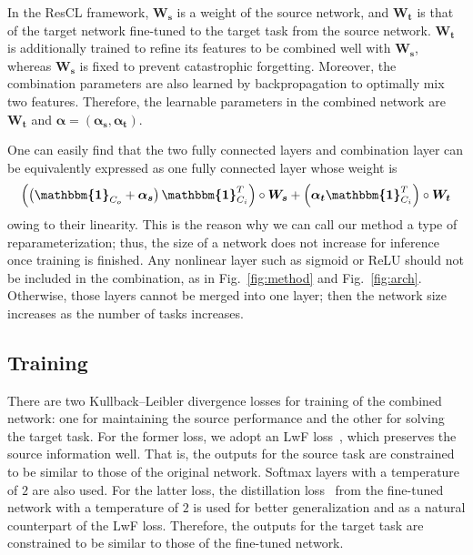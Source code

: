 \documentclass[letterpaper]{article}
\begin{document}
In the ResCL framework, $\bm{W_s}$ is a weight of the source network, and $\bm{W_t}$ is that of the target network fine-tuned to the target task from the source network. $\bm{W_t}$ is additionally trained to refine its features to be combined well with $\bm{W_s}$, whereas $\bm{W_s}$ is fixed to prevent catastrophic forgetting. Moreover, the combination parameters are also learned by backpropagation to optimally mix two features. Therefore, the learnable parameters in the combined network are $\bm{W_t}$ and $\bm{\alpha} = \left(\bm{\alpha_s}, \bm{\alpha_t}\right)$.

One can easily find that the two fully connected layers and combination layer can be equivalently expressed as one fully connected layer whose weight is
\begin{equation}
\left(\left(\bm{\mathbbm{1}}_{C_o} + \bm{\alpha_s}\right) \bm{\mathbbm{1}}^T_{C_i}\right) \circ \bm{W_s} + \left(\bm{\alpha_t} \bm{\mathbbm{1}}^T_{C_i}\right) \circ \bm{W_t}
\label{eq:combine_fc2}
\end{equation}
owing to their linearity. This is the reason why we can call our method a type of reparameterization; thus, the size of a network does not increase for inference once training is finished. Any nonlinear layer such as sigmoid or ReLU should not be included in the combination, as in Fig.~\ref{fig:method} and Fig.~\ref{fig:arch}. Otherwise, those layers cannot be merged into one layer; then the network size increases as the number of tasks increases.



\subsection{Training}

There are two Kullback--Leibler divergence losses for training of the combined network: one for maintaining the source performance and the other for solving the target task. For the former loss, we adopt an LwF loss~\cite{li2018learning}, which preserves the source information well. That is, the outputs for the source task are constrained to be similar to those of the original network. Softmax layers with a temperature of $2$ are also used. For the latter loss, the distillation loss~\cite{hinton2015distilling} from the fine-tuned network with a temperature of $2$ is used for better generalization and as a natural counterpart of the LwF loss. Therefore, the outputs for the target task are constrained to be similar to those of the fine-tuned network.
\end{document}

